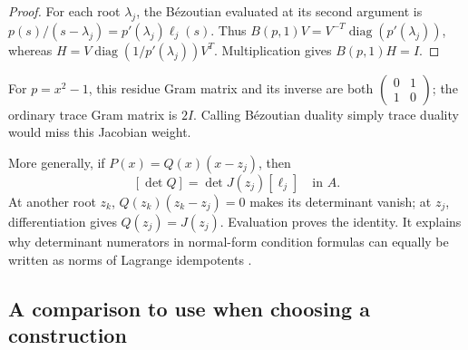 \documentclass[12pt]{article}
\DeclareMathOperator{\diag}{diag}
\theoremstyle{definition}
\theoremstyle{remark}
\begin{document}
\begin{proof}
For each root $\lambda_j$, the B\'ezoutian evaluated at its second argument is
$p(s)/(s-\lambda_j)=p'(\lambda_j)\ell_j(s)$. Thus
$B(p,1)V=V^{-T}\diag(p'(\lambda_j))$, whereas
$H=V\diag(1/p'(\lambda_j))V^T$. Multiplication gives $B(p,1)H=I$.
\end{proof}

For $p=x^2-1$, this residue Gram matrix and its inverse are both
$\left(\begin{smallmatrix}0&1\\1&0\end{smallmatrix}\right)$; the ordinary
trace Gram matrix is $2I$. Calling B\'ezoutian duality simply trace duality would
miss this Jacobian weight.

More generally, if $P(x)=Q(x)(x-z_j)$, then
\[
  [\det Q]=\det J(z_j)[\ell_j]\quad\text{in }A.
\]
At another root $z_k$, $Q(z_k)(z_k-z_j)=0$ makes its determinant vanish; at
$z_j$, differentiation gives $Q(z_j)=J(z_j)$. Evaluation proves the identity.
It explains why determinant numerators in normal-form condition formulas can
equally be written as norms of Lagrange idempotents \cite{graf2026numerical}.

\subsection{A comparison to use when choosing a construction}
\end{document}
